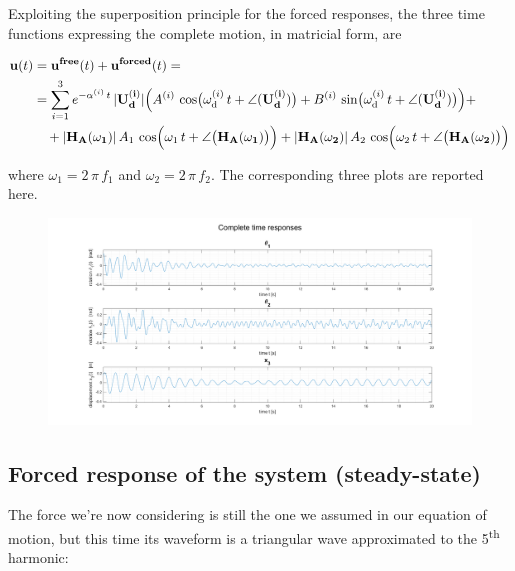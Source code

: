 \documentclass[a4paper,12pt,oneside]{article}
\begin{document}
Exploiting the superposition principle for the forced responses, the three time functions expressing the complete motion, in matricial form, are

\[ \begin{split}
	\mathbf{u}(t) & = \mathbf{u^{free}}(t) + \mathbf{u^{forced}}(t) = \\
								& = \sum_{i=1}^3 e^{-\alpha^{(i)} \, t} \, |\mathbf{U_d^{(i)}}|
									\Bigl(A^{(i)} \,
									\cos\bigl(\omega_\textup{d}^{(i)} \, t +
									\angle(\mathbf{U_d^{(i)}})\bigr) +
									B^{(i)} \,
									\sin\bigl(\omega_\textup{d}^{(i)} \, t +
									\angle(\mathbf{U_d^{(i)}})\bigr)\Bigr) + \\
								& ~~~ + |\mathbf{H_A(\omega_1)}| \, A_1 \, \cos\Bigl(\omega_1 \, t +
									\angle\bigl(\mathbf{H_A(\omega_1)}\bigr)\Bigr) +
									|\mathbf{H_A(\omega_2)}| \, A_2 \, \cos\Bigl(\omega_2 \, t +
									\angle\bigl(\mathbf{H_A(\omega_2)}\bigr)\Bigr)
\end{split} \]

where $ \omega_1 = 2 \, \pi \, f_1 $ and $ \omega_2 = 2 \, \pi \, f_2 $. The corresponding three plots are reported here.

\begin{figure}[h]
	\hspace{-70pt}
	\includegraphics[scale=0.4]{complete_time_responses}
\end{figure}

\subsection{Forced response of the system (steady-state)}

The force we're now considering is still the one we assumed in our equation of motion, but this time its waveform is a triangular wave approximated to the 5\textsuperscript{th} harmonic:
\end{document}
